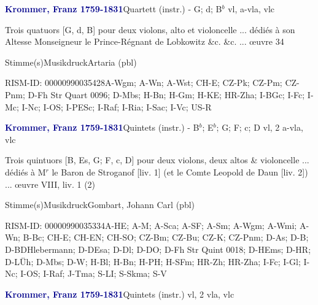 \documentclass[twocolumn, 12pt]{book}
\begin{document}
\par \vspace{16pt} \textcolor{darkblue}{\textbf{Krommer, Franz  1759-1831}}\hfillplus{\textbf{[297]}}\newline Quartett (instr.) - G; d; B$^b$ vl, a-vla, vlc
\par \begin{itshape}Trois quatuors [G, d, B] pour deux violons, alto et violoncelle ... dédiés à son Altesse Monseigneur le Prince-Régnant de Lobkowitz \&c. \&c. ... œuvre 34\end{itshape} 
\par \textcolor{darkblue}{}  Stimme(s)\newline Musikdruck\newline Artaria  (pbl)
\par RISM-ID: 00000990035428\newline A-Wgm; A-Wn; A-Wst; CH-E; CZ-Pk; CZ-Pm; CZ-Pnm; D-Fh  Str Quart 0096; D-Mbs; H-Bn; H-Gm; H-KE; HR-Zha; I-BGc; I-Fc; I-Mc; I-Nc; I-OS; I-PESc; I-Raf; I-Ria; I-Sac; I-Vc; US-R
\par \vspace{16pt} \textcolor{darkblue}{\textbf{Krommer, Franz  1759-1831}}\hfillplus{\textbf{[298]}}\newline Quintets (instr.) - B$^b$; E$^b$; G; F; c; D vl, 2 a-vla, vlc
\par \begin{itshape}Trois quintuors [B, Es, G; F, c, D] pour deux violons, deux altos \& violoncelle ... dédiés à M$^r$ le Baron de Stroganof [liv. 1] (et le Comte Leopold de Daun [liv. 2]) ... œuvre VIII, liv. 1 (2)\end{itshape} 
\par \textcolor{darkblue}{}  Stimme(s)\newline Musikdruck\newline Gombart, Johann Carl  (pbl)
\par RISM-ID: 00000990035334\newline A-HE; A-M; A-Sca; A-SF; A-Sm; A-Wgm; A-Wmi; A-Wn; B-Bc; CH-E; CH-EN; CH-SO; CZ-Bm; CZ-Bu; CZ-K; CZ-Pnm; D-As; D-B; D-BDHlebermann; D-DEsa; D-Dl; D-DO; D-Fh  Str Quint 0018; D-HEms; D-HR; D-LÜh; D-Mbs; D-W; H-Bl; H-Bn; H-PH; H-SFm; HR-Zh; HR-Zha; I-Fc; I-Gl; I-Nc; I-OS; I-Raf; J-Tma; S-LI; S-Skma; S-V
\par \vspace{16pt} \textcolor{darkblue}{\textbf{Krommer, Franz  1759-1831}}\hfillplus{\textbf{[299]}}\newline Quintets (instr.) vl, 2 vla, vlc
\end{document}
